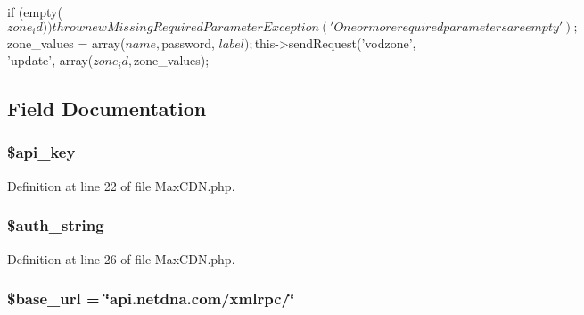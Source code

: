 \begin{DoxyCode}
                                                                                 
       {
    if (empty($zone_id)) {
      throw new MissingRequiredParameterException('One or more required parameter
      s are empty');
    }

        $zone_values = array($name, $password, $label);

    $this->sendRequest('vodzone', 'update', array($zone_id, $zone_values);
  }
\end{DoxyCode}


\subsection{Field Documentation}
\hypertarget{class_max_c_d_n_a186dfe06d14a3bc248c4eb4bcdaec562}{
\subsubsection[{\$api\_\-key}]{\setlength{\rightskip}{0pt plus 5cm}\$api\_\-key}}
\label{class_max_c_d_n_a186dfe06d14a3bc248c4eb4bcdaec562}


Definition at line 22 of file MaxCDN.php.

\hypertarget{class_max_c_d_n_a3538f42031d718c9e5de4b6cd8b7789e}{
\subsubsection[{\$auth\_\-string}]{\setlength{\rightskip}{0pt plus 5cm}\$auth\_\-string}}
\label{class_max_c_d_n_a3538f42031d718c9e5de4b6cd8b7789e}


Definition at line 26 of file MaxCDN.php.

\hypertarget{class_max_c_d_n_a6886427c9c643f707fcb35c018049bc7}{
\subsubsection[{\$base\_\-url}]{\setlength{\rightskip}{0pt plus 5cm}\$base\_\-url = \char`\"{}api.netdna.com/xmlrpc/\char`\"{}}}
\label{class_max_c_d_n_a6886427c9c643f707fcb35c018049bc7}


